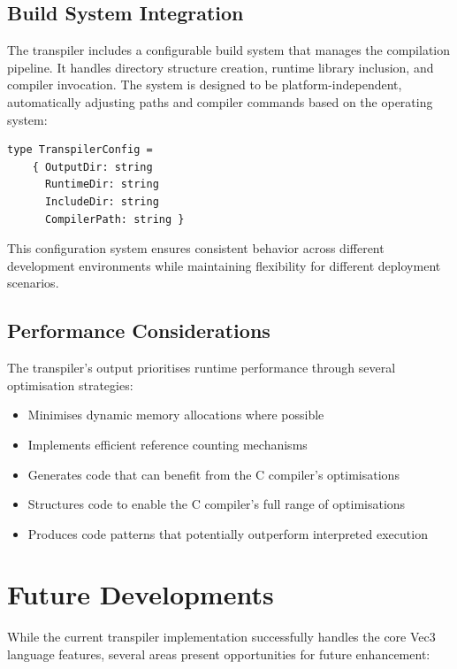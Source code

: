 \subsection{Build System Integration}\label{subsec:build-system-integration}
The transpiler includes a configurable build system that manages the compilation pipeline.
It handles directory structure creation, runtime library inclusion, and compiler invocation.
The system is designed to be platform-independent, automatically adjusting paths and compiler commands based on the operating system:

\begin{verbatim}
type TranspilerConfig =
    { OutputDir: string
      RuntimeDir: string
      IncludeDir: string
      CompilerPath: string }
\end{verbatim}

This configuration system ensures consistent behavior across different development environments while maintaining flexibility for different deployment scenarios.

\subsection{Performance Considerations}\label{subsec:performance-considerations}

The transpiler's output prioritises runtime performance through several optimisation strategies:

\begin{itemize}[nolistsep]
\item Minimises dynamic memory allocations where possible
\item Implements efficient reference counting mechanisms
\item Generates code that can benefit from the C compiler's optimisations
\item Structures code to enable the C compiler's full range of optimisations
\item Produces code patterns that potentially outperform interpreted execution
\end{itemize}

\section{Future Developments}\label{sec:future-developments}
While the current transpiler implementation successfully handles the core Vec3 language features, several areas present opportunities for future enhancement:

